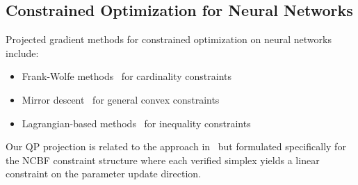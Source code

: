 \subsection{Constrained Optimization for Neural Networks}

Projected gradient methods for constrained optimization on neural networks include:
\begin{itemize}
    \item Frank-Wolfe methods~\citep{jaggi2013sparse} for cardinality constraints
    \item Mirror descent~\citep{beck2003mirror} for general convex constraints  
    \item Lagrangian-based methods~\citep{bertsekas1999nonlinear} for inequality constraints
\end{itemize}

Our QP projection is related to the approach in~\citep{islam2024repair} but formulated specifically for the NCBF constraint structure where each verified simplex yields a linear constraint on the parameter update direction.